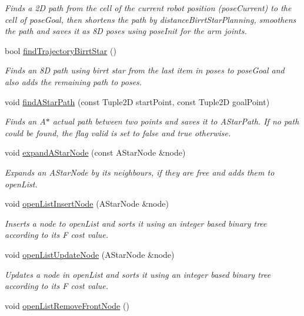 \begin{DoxyCompactItemize}
\begin{DoxyCompactList}\small\item\em Finds a 2\-D path from the cell of the current robot position (pose\-Current) to the cell of pose\-Goal, then shortens the path by distance\-Birrt\-Star\-Planning, smoothens the path and saves it as 8\-D poses using pose\-Init for the arm joints. \end{DoxyCompactList}\item 
bool \hyperlink{classSquirrelMotionPlanner_1_1Planner_a4b28a4fda103fc6c47c5923f4eb61271}{find\-Trajectory\-Birrt\-Star} ()
\begin{DoxyCompactList}\small\item\em Finds an 8\-D path using birrt star from the last item in poses to pose\-Goal and also adds the remaining path to poses. \end{DoxyCompactList}\item 
void \hyperlink{classSquirrelMotionPlanner_1_1Planner_a1729538766406aa345e382441b45ca6a}{find\-A\-Star\-Path} (const Tuple2\-D start\-Point, const Tuple2\-D goal\-Point)
\begin{DoxyCompactList}\small\item\em Finds an A$\ast$ actual path between two points and saves it to A\-Star\-Path. If no path could be found, the flag valid is set to false and true otherwise. \end{DoxyCompactList}\item 
void \hyperlink{classSquirrelMotionPlanner_1_1Planner_a0423f516b51ad039a0002553b39423f1}{expand\-A\-Star\-Node} (const A\-Star\-Node \&node)
\begin{DoxyCompactList}\small\item\em Expands an A\-Star\-Node by its neighbours, if they are free and adds them to open\-List. \end{DoxyCompactList}\item 
void \hyperlink{classSquirrelMotionPlanner_1_1Planner_aa0195b884350f348200790e01fe7d028}{open\-List\-Insert\-Node} (A\-Star\-Node \&node)
\begin{DoxyCompactList}\small\item\em Inserts a node to open\-List and sorts it using an integer based binary tree according to its F cost value. \end{DoxyCompactList}\item 
void \hyperlink{classSquirrelMotionPlanner_1_1Planner_af8e3f71f2905c6bbe2d8bd4272cdb950}{open\-List\-Update\-Node} (A\-Star\-Node \&node)
\begin{DoxyCompactList}\small\item\em Updates a node in open\-List and sorts it using an integer based binary tree according to its F cost value. \end{DoxyCompactList}\item 
\hypertarget{classSquirrelMotionPlanner_1_1Planner_a036b1d33c1a7fb4c5ac73f9109d36954}{void \hyperlink{classSquirrelMotionPlanner_1_1Planner_a036b1d33c1a7fb4c5ac73f9109d36954}{open\-List\-Remove\-Front\-Node} ()}\label{classSquirrelMotionPlanner_1_1Planner_a036b1d33c1a7fb4c5ac73f9109d36954}


\end{DoxyCompactItemize}
